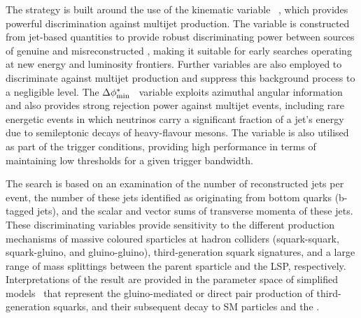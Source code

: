 The strategy is built around the use of the kinematic variable
\alphat~\cite{Randall:2008rw, RA1Paper}, which provides powerful
discrimination against multijet production. The \alphat variable is
constructed from jet-based quantities to provide robust discriminating
power between sources of genuine and misreconstructed \ptvecmiss,
making it suitable for early searches operating at new energy and
luminosity frontiers. Further variables are also employed to
discriminate against multijet production and suppress this background
process to a negligible level. The $\Delta\phi^{*}_{\rm
  min}$~\cite{RA1Paper} variable exploits azimuthal angular
information and also provides strong rejection power against multijet
events, including rare energetic events in which neutrinos carry a
significant fraction of a jet's energy due to semileptonic decays of
heavy-flavour mesons. The \alphat variable is also utilised as part of
the trigger conditions, providing high performance in terms of
maintaining low thresholds for a given trigger bandwidth.


The search is based on an examination of the number of reconstructed
jets per event, the number of these jets identified as originating
from bottom quarks (b-tagged jets), and the scalar and vector sums of
transverse momenta of these jets.  These discriminating variables
provide sensitivity to the different production mechanisms of massive
coloured sparticles at hadron colliders (\ie squark-squark,
squark-gluino, and gluino-gluino), third-generation squark signatures,
and a large range of mass splittings between the parent sparticle and
the LSP, respectively. Interpretations of the result are provided in
the parameter space of simplified models~\cite{Alwall:2008ag,
  Alwall:2008va, sms} that represent the gluino-mediated or direct
pair production of third-generation squarks, and their subsequent
decay to SM particles and the \chiz.

